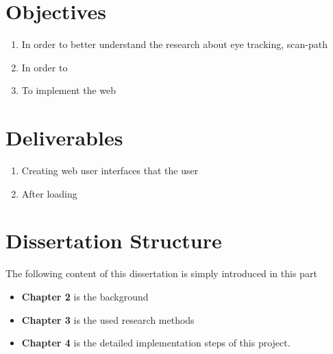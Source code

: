 \documentclass{report}
\begin{document}
		\section{Objectives}
			\begin{enumerate}
				\item In order to better understand the research about eye tracking, scan-path
				
				\item In order to
				
				\item To implement the web
			\end{enumerate}
			
		\section{Deliverables}
			\begin{enumerate}
				\item Creating web user interfaces that the user
				
				\item After loading
			\end{enumerate}
			
		\section{Dissertation Structure}
		The following content of this dissertation is simply introduced in this part
			\begin{itemize}
				\item \textbf{Chapter 2} is the background
				
				\item \textbf{Chapter 3} is the used research methods
				
				\item \textbf{Chapter 4} is the detailed implementation steps of this project.
			\end{itemize}
\end{document}
